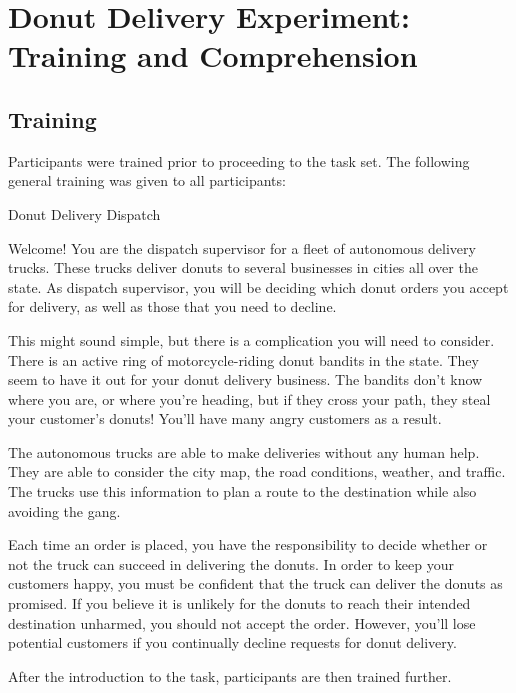 \section{Donut Delivery Experiment: Training and Comprehension} \label{sec:experiment_details}
\subsection{Training} \label{sec:training}
Participants were trained prior to proceeding to the task set. The following general training was given to all participants:

\begin{quoting}
    Donut Delivery Dispatch

    Welcome! You are the dispatch supervisor for a fleet of autonomous delivery trucks. These trucks deliver donuts to several businesses in cities all over the state. As dispatch supervisor, you will be deciding which donut orders you accept for delivery, as well as those that you need to decline.

    This might sound simple, but there is a complication you will need to consider. There is an active ring of motorcycle-riding donut bandits in the state. They seem to have it out for your donut delivery business. The bandits don't know where you are, or where you're heading, but if they cross your path, they steal your customer's donuts! You'll have many angry customers as a result.

    The autonomous trucks are able to make deliveries without any human help. They are able to consider the city map, the road conditions, weather, and traffic. The trucks use this information to plan a route to the destination while also avoiding the gang.

    Each time an order is placed, you have the responsibility to decide whether or not the truck can succeed in delivering the donuts. In order to keep your customers happy, you must be confident that the truck can deliver the donuts as promised. If you believe it is unlikely for the donuts to reach their intended destination unharmed, you should not accept the order. However, you'll lose potential customers if you continually decline requests for donut delivery.
\end{quoting}

After the introduction to the task, participants are then trained further.


